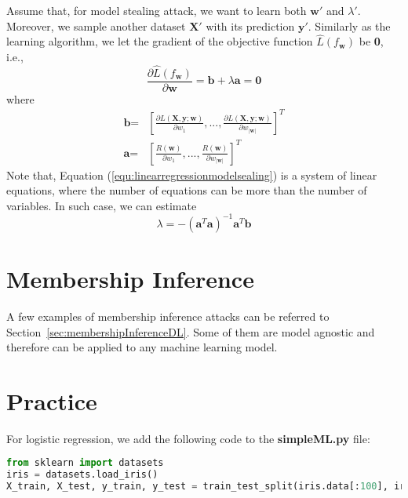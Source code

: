 Assume that, for model stealing attack, we want to learn both $\textbf{w}'$ and $\lambda'$. Moreover, we sample another dataset $\textbf{X}'$ with its prediction $\textbf{y}'$. Similarly as the learning algorithm, we let the gradient of the objective function $\hat{L}(f_\textbf{w})$ be \textbf{0}, i.e., 
\begin{equation}\label{equ:linearregressionmodelsealing}
    \frac{\partial \hat{L}(f_\textbf{w})}{\partial \textbf{w}} = \textbf{b} + \lambda \textbf{a} = \textbf{0}
\end{equation}
where 
\begin{equation} 
    \begin{array}{cl}
      \textbf{b} =   &  \displaystyle [\frac{\partial L(\textbf{X},\textbf{y}; \textbf{w})}{\partial w_1}, ..., \frac{\partial L(\textbf{X},\textbf{y}; \textbf{w})}{\partial w_{|\textbf{w}|}}]^T \\
      \textbf{a} =   & \displaystyle [\frac{R(\textbf{w})}{\partial w_1}, ..., \frac{R(\textbf{w})}{\partial w_{|\textbf{w}|}}]^T
    \end{array}
\end{equation}
Note that, Equation (\ref{equ:linearregressionmodelsealing}) is a system of linear equations, where the number of equations can be more than the number of variables. In such case, we can estimate 
\begin{equation}
    \lambda = - (\textbf{a}^T \textbf{a})^{-1} \textbf{a}^T \textbf{b}
\end{equation}



\section{Membership Inference}

A few examples of membership inference attacks can be referred to Section~\ref{sec:membershipInferenceDL}. Some of them are model agnostic and therefore can be applied to any machine learning model.  

\newpage
\section{Practice}

For logistic regression,  we add the following code to the \textbf{simpleML.py} file: 
\begin{lstlisting}[language=Python]
from sklearn import datasets
iris = datasets.load_iris()
X_train, X_test, y_train, y_test = train_test_split(iris.data[:100], iris.target[:100], test_size=0.20)
\end{lstlisting}

